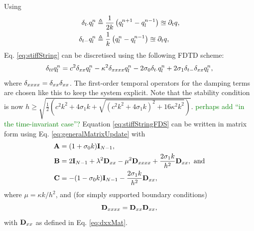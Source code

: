 \documentclass[fleqn]{jaes}
\def\MDcomment[#1]{\textcolor{green}{#1}}
\begin{document}
Using
\begin{subequations}
\begin{align}
    \delta_{t\cdot} q_l^n &\triangleq \frac{1}{2k}\left(q_l^{n+1} - q_l^{n-1}\right) \approxeq \partial_t q ,\\
     \delta_{t-} q_l^n &\triangleq \frac{1}{k}\left(q_l^n- q_l^{n-1}\right) \approxeq  \partial_t q,
\end{align}
\end{subequations}
Eq. \eqref{eq:stiffString} can be discretised using the following FDTD scheme:
\begin{equation}\label{eq:stiffStringFDS}
    \dtt \qln = c^2 \dxx \qln - \kappa^2 \dxxxx \qln - 2\sigma_0\dtd \qln + 2 \sigma_1 \dtm \dxx \qln,
\end{equation}
where $\delta_{xxxx} = \delta_{xx}\delta_{xx}$. The first-order temporal operators for the damping terms are chosen like this to keep the system explicit. Note that the stability condition is now $h\! \geq\! \sqrt{\tfrac{1}{2}(c^2k^2 + 4\sigma_1 k + \sqrt{(c^2k^2 + 4\sigma_1k)^2 +16\kappa^2k^2})}.$  \MDcomment[perhaps add ``in the time-invariant case''?]
Equation \eqref{eq:stiffStringFDS} can be written in matrix form using Eq. \eqref{eq:generalMatrixUpdate} with 
\begin{equation}\label{eq:stiffStringMats}
\begin{aligned}
    \A &= (1 + \sigma_0k)\I_{N-1},\\ \B &= 2\I_{N-1} + \lambda^2 \Dxx - \mu^2 \Dxxxx + \frac{2\sigma_1k}{h^2}\Dxx, \  \text{and}\\
    \C &= -(1 - \sigma_0k)\I_{N-1} - \frac{2\sigma_1k}{h^2}\Dxx,
\end{aligned}
\end{equation}
where $\mu = \kappa k/h^2$, and (for simply supported boundary conditions)
\begin{equation}\label{eq:DxxxxMat}
    \Dxxxx = \Dxx\Dxx,
\end{equation}
with $\mathbf{D}_{xx}$ as defined in Eq. \eqref{eq:dxxMat}.
\end{document}
